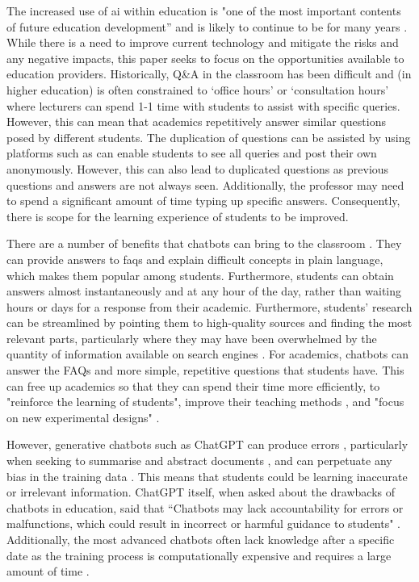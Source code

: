 The increased use of \acrshort{ai} within education is "one of the most important contents of future education development” \citep{BrowMcCoReev2020eu} and is likely to continue to be for many years \citep{zawacki2019systematic}. While there is a need to improve current technology and mitigate the risks and any negative impacts, this paper seeks to focus on the opportunities available to education providers. Historically, Q\&A in the classroom has been difficult and (in higher education) is often constrained to `office hours' or `consultation hours' where lecturers can spend 1-1 time with students to assist with specific queries. However, this can mean that academics repetitively answer similar questions posed by different students. The duplication of questions can be assisted by using platforms such as \citet{Piazza} can enable students to see all queries and post their own anonymously. However, this can also lead to duplicated questions as previous questions and answers are not always seen. Additionally, the professor may need to spend a significant amount of time typing up specific answers. Consequently, there is scope for the learning experience of students to be improved.

There are a number of benefits that chatbots can bring to the classroom \citep{Stanislav}. They can provide answers to \acrshort{faq}s and explain difficult concepts in plain language, which makes them popular among students. Furthermore, students can obtain answers almost instantaneously and at any hour of the day, rather than waiting hours or days for a response from their academic. Furthermore, students' research can be streamlined by pointing them to high-quality sources and finding the most relevant parts, particularly where they may have been overwhelmed by the quantity of information available on search engines \citep{Chen22}. For academics, chatbots can answer the FAQs and more simple, repetitive questions that students have. This can free up academics so that they can spend their time more efficiently, to "reinforce the learning of students", improve their teaching methods \citep{Prez2020}, and "focus on new experimental designs" \citep{Eva}.

However, generative chatbots such as ChatGPT can produce errors \citep{marcus2018, Bender21, Eva}, particularly when seeking to summarise and abstract documents \citep{Durmus_2020}, and can perpetuate any bias in the training data \citep{geva2019, brown2020}. This means that students could be learning inaccurate or irrelevant information. ChatGPT itself, when asked about the drawbacks of chatbots in education, said that ``Chatbots may lack accountability for errors or malfunctions, which could result in incorrect or harmful guidance to students" \citep{chatgpt23}. Additionally, the most advanced chatbots often lack knowledge after a specific date as the training process is computationally expensive and requires a large amount of time \citep{Jungherr}.

